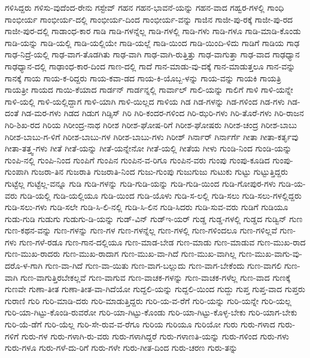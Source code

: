 {ಗಳಿಸಿದ್ದರು
ಗಳಿಸು-ವುದೆಂದ-ರೇನು
ಗಸ್ಟೇವ್
ಗಹನ
ಗಹನ-ಭಾವನೆ-ಯನ್ನು
ಗಹನ-ವಾದ
ಗಹ್ವರ-ಗಳಲ್ಲಿ
ಗಾಂಧಿ
ಗಾಂಭೀರ್ಯ
ಗಾಂಭೀರ್ಯ-ದಲ್ಲಿ
ಗಾಂಭೀರ್ಯ-ದಿಂದ
ಗಾಂಭೀರ್ಯ-ವನ್ನು
ಗಾಜಿನ
ಗಾಜೀ-ಪು-ರಕ್ಕೆ
ಗಾಜೀ-ಪು-ರದ
ಗಾಜೀ-ಪುರ-ದಲ್ಲಿ
ಗಾಡಾಂಧ-ಕಾರ
ಗಾಡಿ
ಗಾಡಿ-ಗಳನ್ನೆಲ್ಲ
ಗಾಡಿ-ಗಳಲ್ಲಿ
ಗಾಡಿ-ಗಳು
ಗಾಡಿ-ಗಳೂ
ಗಾಡಿ-ಮಾಡಿ-ಕೊಂಡು
ಗಾಡಿ-ಯನ್ನು
ಗಾಡಿ-ಯಲ್ಲಿ
ಗಾಡಿ-ಯಲ್ಲಿಯೇ
ಗಾಡಿ-ಯಲ್ಲೆ
ಗಾಡಿ-ಯಿಂದ
ಗಾಡಿ-ಯಿಂದಿ-ಳಿದು
ಗಾಡಿಗೆ
ಗಾಡಿಯ
ಗಾಢ
ಗಾಢ-ನಿದ್ರೆ-ಯಲ್ಲಿ
ಗಾಢ-ವಾಗ-ತೊಡಗಿತು
ಗಾಢ-ವಾಗಿ
ಗಾಢ-ವಾಗಿ-ರುತ್ತಿತ್ತು
ಗಾಢ-ವಾಗುತ್ತಾ
ಗಾಢ-ವಾದ
ಗಾಢಧ್ಯಾನ
ಗಾಢಧ್ಯಾನ-ದಲ್ಲಿ
ಗಾಢಾಂಧ-ಕಾರ-ದಿಂದ
ಗಾಣ-ದಲ್ಲಿ
ಗಾದೆ
ಗಾನ-ಮಾಡು-ವು-ದಕ್ಕೆ
ಗಾನ-ಮಾಡುತ್ತಲೂ
ಗಾನ-ವನ್ನು
ಗಾನಕ್ಕೆ
ಗಾಯ
ಗಾಯ-ಕ-ರಿದ್ದರು
ಗಾಯ-ಕವಾ-ಡದ
ಗಾಯ-ಕಿ-ಯೊಬ್ಬ-ಳನ್ನು
ಗಾಯ-ವನ್ನು
ಗಾಯಕಿ
ಗಾಯತ್ರಿ
ಗಾಯತ್ರೀ
ಗಾಯದ
ಗಾಯಿ-ಕೆಯಾದ
ಗಾರ್ಡನ್
ಗಾರ್ಡನ್ನಲ್ಲಿ
ಗಾರ್ವಾಲ್
ಗಾಲಿ-ಯನ್ನು
ಗಾಲಿಗೆ
ಗಾಳಿ
ಗಾಳಿ-ಯನ್ನೇ
ಗಾಳಿ-ಯಲ್ಲಿ
ಗಾಳಿ-ಯಲ್ಲಿದ್ದಾಗ
ಗಾಳಿ-ಯಾಗಿ
ಗಾಳಿ-ಯಿಲ್ಲದ
ಗಾಳಿಯ
ಗಿಡ
ಗಿಡ-ಗಳನ್ನು
ಗಿಡ-ಗಳಿಂದ
ಗಿಡ-ಗಳು
ಗಿಡ-ದಂತೆ
ಗಿಡ-ಮರ-ಗಳು
ಗಿಡದ
ಗಿಡುಗ
ಗಿಡ್ಸಿಸ್
ಗಿರಿ
ಗಿರಿ-ಕಂದರ-ಗಳಿಂದ
ಗಿರಿ-ಝರಿ-ಗಳು
ಗಿರಿ-ತೊರೆ-ಗಳು
ಗಿರಿ-ರಾಜನ
ಗಿರಿ-ಶಿಖ-ರದ
ಗಿರಿಯ
ಗಿರೀಂದ್ರ-ನಾಥ
ಗಿರೀಶ
ಗಿರೀಶ-ಘೋಷ-ರಿಗೆ
ಗಿರೀಶ-ಘೋಷರು
ಗಿರೀಶ-ಚಂದ್ರ
ಗಿರೀಶ-ಬಾಬು
ಗಿರೀಶ-ಬಾಬು-ಗ-ಳಿಗೆ
ಗಿರೀಶ-ಬಾಬು-ಗಳ
ಗಿರೀಶ-ಬಾಬು-ಗಳು
ಗಿರೀಶ್
ಗಿರ್ನಾರ್
ಗಿರ್ನಾರ್ಗೆ
ಗೀತಾ
ಗೀತಾ-ಕರ್ತೃವು
ಗೀತಾ-ತತ್ತ್ವ-ಗಳು
ಗೀತೆ
ಗೀತೆ-ಯನ್ನು
ಗೀತೆ-ಯನ್ನೇನೋ
ಗೀತೆ-ಯಲ್ಲಿ
ಗೀತೆಯ
ಗೀಳು
ಗುಂಡಿ-ನಿಂದ
ಗುಂಡಿ-ಯನ್ನು
ಗುಂಪಿ-ನಲ್ಲಿ
ಗುಂಪಿ-ನಿಂದ
ಗುಂಪಿಗೆ
ಗುಂಪಿನ
ಗುಂಪಿನ-ವ-ರಿಗೂ
ಗುಂಪಿನ-ವರು
ಗುಂಪು
ಗುಂಪು-ಕೂಡಿದ
ಗುಂಪು-ಗುಂಪಾಗಿ
ಗುಜರಾ-ತಿನ
ಗುಜರಾತಿ
ಗುಜರಾತಿ-ನಿಂದ
ಗುಜು-ಗುಂಪು
ಗುಜುಗುಜು
ಗುಟುಕು
ಗುಟ್ಟು
ಗುಟ್ಟುತ್ತಿದ್ದರು
ಗುಟ್ಟೆಲ್ಲ
ಗುಟ್ಟೆಲ್ಲ-ವನ್ನೂ
ಗುಡಿ
ಗುಡಿ-ಗಳನ್ನು
ಗುಡಿ-ಗುಡಿ-ಯನ್ನು
ಗುಡಿ-ಗುಡಿ-ಯಿಂದ
ಗುಡಿ-ಗೋಪುರ-ಗಳು
ಗುಡಿ-ಯ-ವರು
ಗುಡಿ-ಯಲ್ಲಿ
ಗುಡಿ-ಯಲ್ಲಿಯೂ
ಗುಡಿ-ಯಿಂದ
ಗುಡಿ-ಯೊಳು
ಗುಡಿ-ಸ-ಲಲ್ಲಿ
ಗುಡಿ-ಸಲು
ಗುಡಿ-ಸಲು-ಗಳಲ್ಲಿದ್ದರು
ಗುಡಿ-ಸಲು-ಗಳು
ಗುಡಿ-ಸಲೇ
ಗುಡಿ-ಸಿ-ಲಿ-ನಲ್ಲಿ
ಗುಡಿ-ಸಿ-ಲಿನ
ಗುಡಿ-ಸಿದರು
ಗುಡಿ-ಸುವ-ವರು
ಗುಡಿಗೆ
ಗುಡಿಯೂ
ಗುಡು-ಗುಡಿ
ಗುಡುಗು
ಗುಡುಗು-ಡಿ-ಯನ್ನು
ಗುಡ್-ವಿನ್
ಗುಡ್ಇ-ಯರ್
ಗುಡ್ಡ
ಗುಡ್ಡ-ಗಳಲ್ಲಿ
ಗುಡ್ಡದ
ಗುಡ್ವಿನ್
ಗುಣ
ಗುಣ-ಕಥನ-ವನ್ನು
ಗುಣ-ಗಳನ್ನು
ಗುಣ-ಗಳ
ಗುಣ-ಗಳನ್ನೆಲ್ಲ
ಗುಣ-ಗಳಲ್ಲಿ
ಗುಣ-ಗಳಿಂದಲೂ
ಗುಣ-ಗಳಿಲ್ಲವೆ
ಗುಣ-ಗಳು
ಗುಣ-ಗಳೆ-ರಡೂ
ಗುಣ-ಗಾನ-ದಲ್ಲಿಯೂ
ಗುಣ-ಮಾಡ-ಬೇಡ
ಗುಣ-ಮಾಡು
ಗುಣ-ಮಾಡುವ
ಗುಣ-ಮುಖ-ರಾದ
ಗುಣ-ಮುಖ-ರಾದರು
ಗುಣ-ಮುಖ-ರಾದಾಗ
ಗುಣ-ಮುಖ-ವಾ-ಗಿದೆ
ಗುಣ-ಮುಖ-ವಾಗಿಲ್ಲ
ಗುಣ-ಮುಖ-ವಾಗು-ವು-ದರೊ-ಳ-ಗಾಗಿ
ಗುಣ-ವಾ-ಗಿದೆ
ಗುಣ-ವಾ-ಯಿತು
ಗುಣ-ವಾಗ-ಬಲ್ಲುದು
ಗುಣ-ವಾಗ-ಬೇಕೆಂದು
ಗುಣ-ವಾಗಲಿ
ಗುಣ-ವಾಗಿ
ಗುಣ-ವಾಗುತ್ತಿರಬೇಕಲ್ಲವೆ
ಗುಣ-ವಾಗುವ
ಗುಣ-ವಾಚಕ-ಗಳನ್ನು
ಗುಣ-ವಾಚಕ-ಗಳೆಲ್ಲ
ಗುಣ-ವಾದ
ಗುಣಕ್ಕೆ
ಗುಣವೇ
ಗುಣಾ-ತೀತ
ಗುಣಾ-ತೀತ-ವಾ-ಗಿದೆಯೋ
ಗುದ್ದಲಿ-ಯನ್ನು
ಗುದ್ದಲಿ-ಯಿಂದ
ಗುದ್ದು
ಗುಪ್ತ
ಗುಪ್ತ-ವಾದ
ಗುಪ್ತರು
ಗುರಾಣಿ
ಗುರಿ
ಗುರಿ-ಮಾಡಿ-ದರು
ಗುರಿ-ಮಾಡುತ್ತಿದ್ದರು
ಗುರಿ-ಯ-ವ-ರೆಗೆ
ಗುರಿ-ಯನ್ನು
ಗುರಿ-ಯನ್ನೇ
ಗುರಿ-ಯಲ್ಲ
ಗುರಿ-ಯಾ-ಗಿಟ್ಟು-ಕೊಂಡಿ-ರುವರೋ
ಗುರಿ-ಯಾ-ಗಿಟ್ಟು-ಕೊಂಡು
ಗುರಿ-ಯಾ-ಗಿಟ್ಟು-ಕೊಳ್ಳ-ಬೇಕು
ಗುರಿ-ಯಾಗ-ಬೇಕು
ಗುರಿ-ಯೆ-ಡೆಗೆ
ಗುರಿ-ಯೆಲ್ಲ
ಗುರಿ-ಸೇ-ರುವ-ವ-ರೆಗೂ
ಗುರಿಯ
ಗುರಿಯೂ
ಗುರಿಯೋ
ಗುರು
ಗುರು-ಗಳಾದ
ಗುರು-ಗಳಿಗೆ
ಗುರು-ಗಳ
ಗುರು-ಗಳಾಗಿ-ರು-ವರು
ಗುರು-ಗಳಾಗಿದ್ದರೆ
ಗುರು-ಗಳಾಣತಿ-ಯನ್ನು
ಗುರು-ಗಳಿಂದ
ಗುರು-ಗಳು
ಗುರು-ಗಳೂ
ಗುರು-ಗಳೆ-ದು-ರಿಗೆ
ಗುರು-ಗಳೇ
ಗುರು-ಗೀತ-ದಿಂದ
ಗುರು-ಚರಣ
ಗುರು-ತನ್ನು
}
